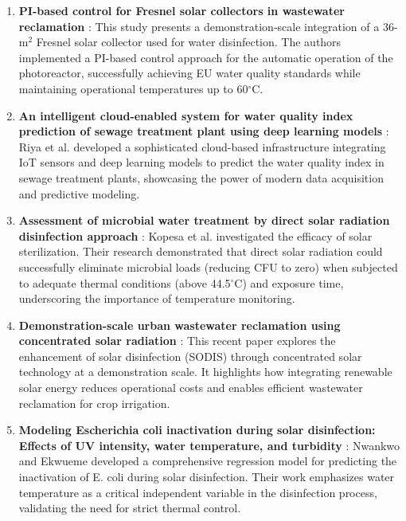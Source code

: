 \documentclass[12pt,a4paper]{report}
\begin{document}
\begin{enumerate}
    \item \textbf{PI-based control for Fresnel solar collectors in wastewater reclamation} \citep{rodriguez2024}: This study presents a demonstration-scale integration of a 36-m$^2$ Fresnel solar collector used for water disinfection. The authors implemented a PI-based control approach for the automatic operation of the photoreactor, successfully achieving EU water quality standards while maintaining operational temperatures up to 60$^\circ$C.
    \item \textbf{An intelligent cloud-enabled system for water quality index prediction of sewage treatment plant using deep learning models} \citep{riya2025}: Riya et al. developed a sophisticated cloud-based infrastructure integrating IoT sensors and deep learning models to predict the water quality index in sewage treatment plants, showcasing the power of modern data acquisition and predictive modeling.
    \item \textbf{Assessment of microbial water treatment by direct solar radiation disinfection approach} \citep{kopesa2024}: Kopesa et al. investigated the efficacy of solar sterilization. Their research demonstrated that direct solar radiation could successfully eliminate microbial loads (reducing CFU to zero) when subjected to adequate thermal conditions (above 44.5$^\circ$C) and exposure time, underscoring the importance of temperature monitoring.
    \item \textbf{Demonstration-scale urban wastewater reclamation using concentrated solar radiation} \citep{rodriguez2025}: This recent paper explores the enhancement of solar disinfection (SODIS) through concentrated solar technology at a demonstration scale. It highlights how integrating renewable solar energy reduces operational costs and enables efficient wastewater reclamation for crop irrigation.
    \item \textbf{Modeling Escherichia coli inactivation during solar disinfection: Effects of UV intensity, water temperature, and turbidity} \citep{nwankwo2024}: Nwankwo and Ekwueme developed a comprehensive regression model for predicting the inactivation of E. coli during solar disinfection. Their work emphasizes water temperature as a critical independent variable in the disinfection process, validating the need for strict thermal control.
\end{enumerate}
\end{document}
